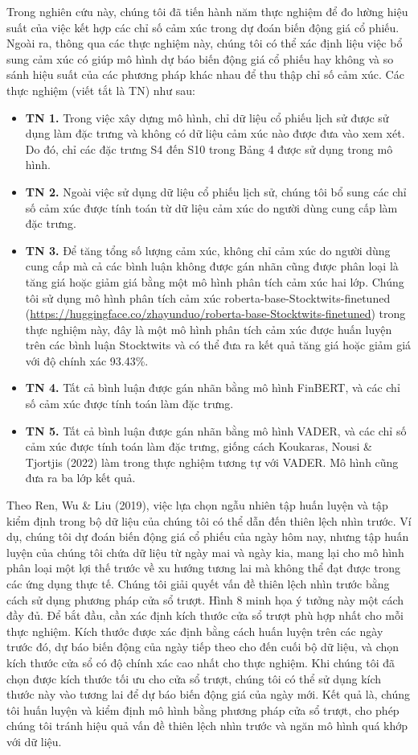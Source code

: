 Trong nghiên cứu này, chúng tôi đã tiến hành năm thực nghiệm để đo lường hiệu suất của việc kết hợp các chỉ số cảm xúc trong dự đoán biến động giá cổ phiếu. Ngoài ra, thông qua các thực nghiệm này, chúng tôi có thể xác định liệu việc bổ sung cảm xúc có giúp mô hình dự báo biến động giá cổ phiếu hay không và so sánh hiệu suất của các phương pháp khác nhau để thu thập chỉ số cảm xúc. Các thực nghiệm (viết tắt là TN) như sau:
\begin{itemize}
  \item \textbf{TN 1.} Trong việc xây dựng mô hình, chỉ dữ liệu cổ phiếu lịch sử được sử dụng làm đặc trưng và không có dữ liệu cảm xúc nào được đưa vào xem xét. Do đó, chỉ các đặc trưng S4 đến S10 trong Bảng 4 được sử dụng trong mô hình.
  \item \textbf{TN 2.} Ngoài việc sử dụng dữ liệu cổ phiếu lịch sử, chúng tôi bổ sung các chỉ số cảm xúc được tính toán từ dữ liệu cảm xúc do người dùng cung cấp làm đặc trưng.
  \item \textbf{TN 3.} Để tăng tổng số lượng cảm xúc, không chỉ cảm xúc do người dùng cung cấp mà cả các bình luận không được gán nhãn cũng được phân loại là tăng giá hoặc giảm giá bằng một mô hình phân tích cảm xúc hai lớp. Chúng tôi sử dụng mô hình phân tích cảm xúc roberta-base-Stocktwits-finetuned (\url{https://huggingface.co/zhayunduo/roberta-base-Stocktwits-finetuned}) trong thực nghiệm này, đây là một mô hình phân tích cảm xúc được huấn luyện trên các bình luận Stocktwits và có thể đưa ra kết quả tăng giá hoặc giảm giá với độ chính xác 93.43\%.
  \item \textbf{TN 4.} Tất cả bình luận được gán nhãn bằng mô hình FinBERT, và các chỉ số cảm xúc được tính toán làm đặc trưng.
  \item \textbf{TN 5.} Tất cả bình luận được gán nhãn bằng mô hình VADER, và các chỉ số cảm xúc được tính toán làm đặc trưng, giống cách Koukaras, Nousi \& Tjortjis (2022) làm trong thực nghiệm tương tự với VADER. Mô hình cũng đưa ra ba lớp kết quả.
\end{itemize}

Theo Ren, Wu \& Liu (2019), việc lựa chọn ngẫu nhiên tập huấn luyện và tập kiểm định trong bộ dữ liệu của chúng tôi có thể dẫn đến thiên lệch nhìn trước. Ví dụ, chúng tôi dự đoán biến động giá cổ phiếu của ngày hôm nay, nhưng tập huấn luyện của chúng tôi chứa dữ liệu từ ngày mai và ngày kia, mang lại cho mô hình phân loại một lợi thế trước về xu hướng tương lai mà không thể đạt được trong các ứng dụng thực tế. Chúng tôi giải quyết vấn đề thiên lệch nhìn trước bằng cách sử dụng phương pháp cửa sổ trượt. Hình 8 minh họa ý tưởng này một cách đầy đủ. Để bắt đầu, cần xác định kích thước cửa sổ trượt phù hợp nhất cho mỗi thực nghiệm. Kích thước được xác định bằng cách huấn luyện trên các ngày trước đó, dự báo biến động của ngày tiếp theo cho đến cuối bộ dữ liệu, và chọn kích thước cửa sổ có độ chính xác cao nhất cho thực nghiệm. Khi chúng tôi đã chọn được kích thước tối ưu cho cửa sổ trượt, chúng tôi có thể sử dụng kích thước này vào tương lai để dự báo biến động giá của ngày mới. Kết quả là, chúng tôi huấn luyện và kiểm định mô hình bằng phương pháp cửa sổ trượt, cho phép chúng tôi tránh hiệu quả vấn đề thiên lệch nhìn trước và ngăn mô hình quá khớp với dữ liệu.

